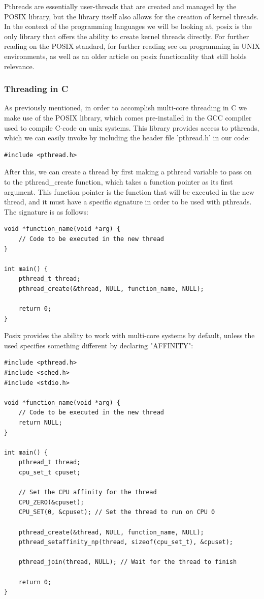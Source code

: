 \documentclass[12pt,a4paper]{article}
\begin{document}
Pthreads are essentially user-threads that are created and managed by the POSIX library, but the library itself also allows for the creation of kernel threads. In the context of the programming languages we will be looking at, posix is the only library that offers the ability to create kernel threads directly. For further reading on the POSIX standard, for further reading see  on programming in UNIX environments, as well as  an older article on posix functionality that still holds relevance.

\subsubsection{Threading in C}

As previously mentioned, in order to accomplish multi-core threading in C we make use of the POSIX library, which comes pre-installed in the GCC compiler used to compile C-code on unix systems. This library provides access to pthreads, which we can easily invoke by including the header file 'pthread.h' in our code:

\begin{verbatim}
#include <pthread.h>
\end{verbatim}

After this, we can create a thread by first making a pthread variable to pass on to the pthread\_create function, which takes a function pointer as its first argument. This function pointer is the function that will be executed in the new thread, and it must have a specific signature in order to be used with pthreads. The signature is as follows:

\begin{verbatim}
void *function_name(void *arg) {
    // Code to be executed in the new thread
}

int main() {
    pthread_t thread;
    pthread_create(&thread, NULL, function_name, NULL);

    return 0;
}
\end{verbatim}

Posix provides the ability to work with multi-core systems by default, unless the used specifies something different by declaring "AFFINITY":

\begin{verbatim}
#include <pthread.h>
#include <sched.h>
#include <stdio.h>

void *function_name(void *arg) {
    // Code to be executed in the new thread
    return NULL;
}

int main() {
    pthread_t thread;
    cpu_set_t cpuset;

    // Set the CPU affinity for the thread
    CPU_ZERO(&cpuset);
    CPU_SET(0, &cpuset); // Set the thread to run on CPU 0

    pthread_create(&thread, NULL, function_name, NULL);
    pthread_setaffinity_np(thread, sizeof(cpu_set_t), &cpuset);

    pthread_join(thread, NULL); // Wait for the thread to finish

    return 0;
}
\end{verbatim}
\end{document}
